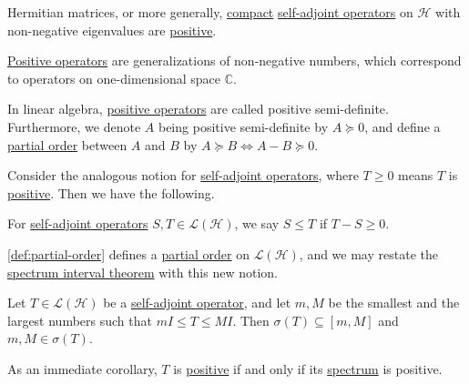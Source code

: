 \begin{eg}
	Hermitian matrices, or more generally, \hyperref[def:compact-op]{compact} \hyperref[def:self-adjoint-op]{self-adjoint operators} on \(\mathcal{H} \) with non-negative eigenvalues are \hyperref[def:positive-op]{positive}.
\end{eg}

\begin{note}
	\hyperref[def:positive-op]{Positive operators} are generalizations of non-negative numbers, which correspond to operators on one-dimensional space \(\mathbb{C} \).
\end{note}

\begin{remark}
	In linear algebra, \hyperref[def:positive-op]{positive operators} are called positive semi-definite. Furthermore, we denote \(A\) being positive semi-definite by \(A \succeq 0\), and define a \href{https://en.wikipedia.org/wiki/Partially_ordered_set}{partial order} between \(A\) and \(B\) by  \(A \succeq B \iff A - B \succeq 0\).
\end{remark}

Consider the analogous notion for \hyperref[def:self-adjoint-op]{self-adjoint operators}, where \(T \geq 0\) means \(T\) is \hyperref[def:positive-op]{positive}. Then we have the following.

\begin{definition}\label{def:partial-order}
	For \hyperref[def:self-adjoint-op]{self-adjoint operators} \(S, T\in \mathcal{L} (\mathcal{H} )\), we say \(S \leq T\) if \(T - S \geq 0\).
\end{definition}

\autoref{def:partial-order} defines a \href{https://en.wikipedia.org/wiki/Partially_ordered_set}{partial order} on \(\mathcal{L} (\mathcal{H} )\), and we may restate the \hyperref[thm:spectrum-interval]{spectrum interval theorem} with this new notion.

\begin{theorem}\label{thm:spectrum-interval-2}
	Let \(T\in \mathcal{L} (\mathcal{H} )\) be a \hyperref[def:self-adjoint-op]{self-adjoint operator}, and let \(m, M\) be the smallest and the largest numbers such that \(mI \leq T \leq MI\). Then \(\sigma (T) \subseteq [m, M]\) and \(m, M\in \sigma (T)\).
\end{theorem}

As an immediate corollary, \(T\) is \hyperref[def:positive-op]{positive} if and only if its \hyperref[def:spectrum-point]{spectrum} is positive.

